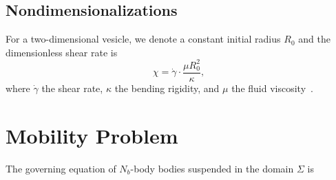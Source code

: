 \documentclass[%
 reprint,
 amsmath,amssymb,
 aps,
]{revtex4-2}
\begin{document}
\subsection{Nondimensionalizations}



For a two-dimensional vesicle, we denote a constant initial radius $R_0$ and 
the dimensionless shear rate is
\begin{equation}
\chi = \dot\gamma \cdot\frac{\mu R_0^2}{\kappa},
\end{equation}
%
where $\dot\gamma$ the shear rate, $\kappa$ the bending rigidity, and $\mu$ the fluid viscosity~\cite{Finken08}.



\section{\label{mobility}Mobility Problem}

The governing equation of $N_b$-body bodies suspended in the domain $\Sigma$ is
 
\end{document}
